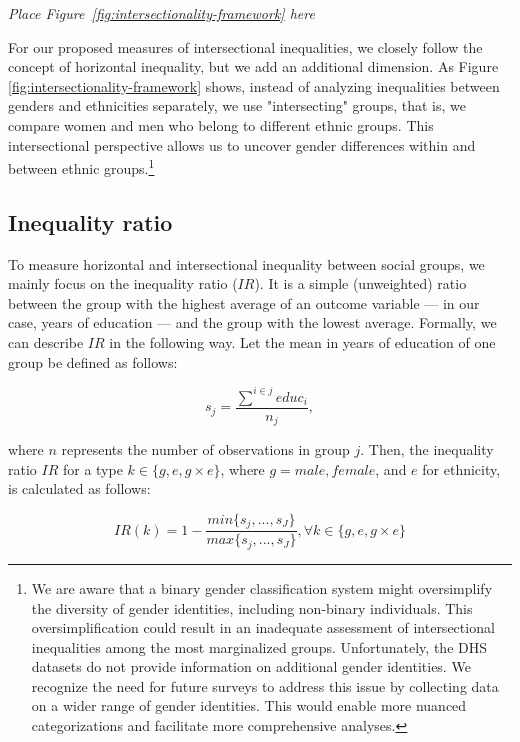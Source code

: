 \begin{center}
    \textit{Place Figure~\ref{fig:intersectionality-framework} here}
\end{center}

For our proposed measures of intersectional inequalities, we closely follow the concept of horizontal inequality, but we add an additional dimension. As Figure \ref{fig:intersectionality-framework} shows, instead of analyzing inequalities between genders and ethnicities separately, we use "intersecting" groups, that is, we compare women and men who belong to different ethnic groups. This intersectional perspective allows us to uncover gender differences within and between ethnic groups.\footnote{We are aware that a binary gender classification system might oversimplify the diversity of gender identities, including non-binary individuals. This oversimplification could result in an inadequate assessment of intersectional inequalities among the most marginalized groups. Unfortunately, the DHS datasets do not provide information on additional gender identities. We recognize the need for future surveys to address this issue by collecting data on a wider range of gender identities. This would enable more nuanced categorizations and facilitate more comprehensive analyses.}

\hypertarget{inequality-ratio.}{%
\subsection{Inequality ratio}\label{inequality-ratio.}}

To measure horizontal and intersectional inequality between social groups, we mainly focus on the inequality ratio ($IR$). It is a simple (unweighted) ratio between the group with the highest average of an outcome variable --- in our case, years of education --- and the group with the lowest average. Formally, we can describe $IR$ in the following way. Let the mean in years of education of one group be defined as follows:

\begin{equation}
    s_{j}= \frac{\sum^{i \in j} educ_i}{n_j},
\end{equation}

where $n$ represents the number of observations in group $j$. Then, the inequality ratio $IR$ for a type $k\in\{g, e, g\times e\}$, where $g= male, female$, and $e$ for ethnicity, is calculated as follows:

\begin{equation}
    IR(k) = 1- \frac{min\{s_j,...,s_J\}}{max\{s_j,...,s_J\}}, \forall k\in\{g, e, g \times e\}
\end{equation}

